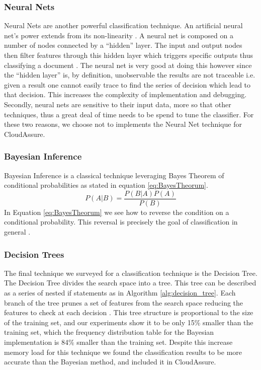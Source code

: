 \subsubsection{Neural Nets}
Neural Nets are another powerful classification technique. An artificial neural
net's power
extends from its non-linearity \autocite{Zhang2000}. A neural net is composed on
a number of nodes connected by a ``hidden'' layer. The input and output nodes
then filter features through this hidden layer which triggers specific outputs
thus classifying a document \autocite{Merkl}. The neural net is very good at
doing this however since the ``hidden layer'' is, by definition, unobservable
the results are not traceable i.e. given a result one cannot easily trace to
find the series of decision which lead to that decision. This increases the
complexity of implementation and debugging. Secondly, neural nets are sensitive
to their input data, more so that other techniques, thus a great deal of time
needs to be spend to tune the classifier. For these two reasons, we choose not
to implements the Neural Net technique for CloudAssure. 

\subsubsection{Bayesian Inference}
Bayesian Inference is a classical technique leveraging Bayes Theorem of
conditional probabilities as stated in equation \ref{eq:BayesTheorum}.
\begin{equation}
    P(A|B) = \frac{P(B | A) P(A)}{P(B)}
    \label{eq:BayesTheorum}
\end{equation}
In Equation \ref{eq:BayesTheorum} we see how to reverse the condition on a conditional probability.
This reversal is precisely the goal of classification in general \autocite{Bishop2009}.

\subsubsection{Decision Trees}
The final technique we surveyed for a classification technique is the Decision
Tree. The Decision Tree divides the search space into a tree. This tree can be
described as a series of nested if statements as in
Algorithm \ref{alg:decision_tree}. Each branch of the
tree prunes a set of features from the search space reducing the features to
check at each decision \autocite{Segaran2008}. This tree structure is
proportional to the size of the training set, and our experiments show it to be
only 15\% smaller than the training set, which the frequency distribution table
for the Bayesian implementation is 84\% smaller than the training set. Despite
this increase memory load for this technique we found the classification
results to be more accurate than the Bayesian method, and included it in
CloudAssure.

